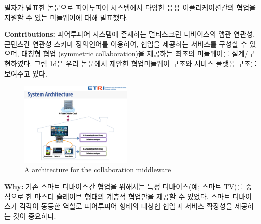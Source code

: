 \documentclass[twocolumn]{article}
\newcommand{\bi}{\begin{itemize}}
\newcommand{\ei}{\end{itemize}}
\newcommand{\ii}{\item}
\begin{document}
필자가 발표한 논문으로 피어투피어 시스템에서 다양한 응용 어플리케이션간의 협업을 지원할 수 있는 미들웨어에 대해 발표했다.
%

\noindent
\textbf{Contributions:} 피어투피어 시스템에 존재하는 멀티스크린 디바이스의 앱관 연관성, 콘텐츠간 연관성 스키마 정의언어를 이용하여, 협업을 제공하는 서비스를 구성할 수 있으며, 대칭형 협업 (symmetric collaboration)을 제공하는 최초의 미들웨어를 설계/구현하였다. 그림 \ref{fig:middleware-architecture}d은 우리 논문에서 제안한 협업미들웨어 구조와 서비스 플랫폼 구조를 보여주고 있다.

\begin{figure}[htb]
        \centering
        \includegraphics[width=0.48\textwidth]{middleware.pdf}
        \caption{A architecture for the collaboration middleware}
        \label{fig:middleware-architecture}
\end{figure}

\noindent
\textbf{Why:} 기존 스마트 디바이스간 협업을 위해서는 특정 디바이스(예; 스마트 TV)를 중심으로 한 마스터 슬레이브 형태의 계층적 협업만을 제공할 수 있었다. 스마트 디바이스가 각각이 동등한 역할로 피어투피어 형태의 대칭협 협업과 서비스 확장성을 제공하는 것이 중요하다. 
\end{document}
